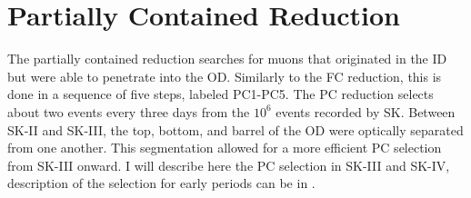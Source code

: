\section{Partially Contained Reduction}
The partially contained reduction searches for muons that originated in the ID but were able to penetrate into the OD.  Similarly to the FC reduction, this is done in a sequence of five steps, labeled PC1-PC5.  The PC reduction selects about two events every three days from the $10^6$ events recorded by SK.  Between SK-II and SK-III, the top, bottom, and barrel of the OD were optically separated from one another.  This segmentation allowed for a more efficient PC selection from SK-III onward.  I will describe here the PC selection in SK-III and SK-IV, description of the selection for early periods can be in \cite{Dufour:2009ljt}. 